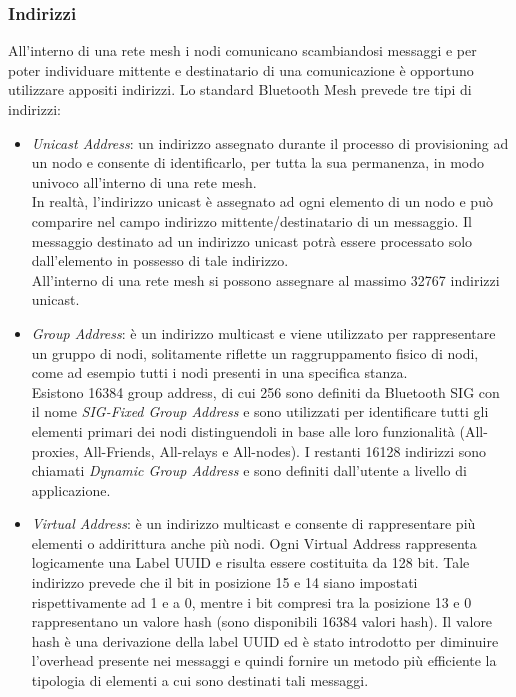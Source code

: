 \subsubsection{Indirizzi}
\label{subsub:indirizzi}
All'interno di una rete mesh i nodi comunicano scambiandosi messaggi e per poter individuare mittente e destinatario di una comunicazione è opportuno utilizzare appositi indirizzi. Lo standard Bluetooth Mesh prevede tre tipi di indirizzi:
\begin{itemize}
    \item \textit{Unicast Address}: un indirizzo assegnato durante il processo di provisioning ad un nodo e consente di identificarlo, per tutta la sua permanenza, in modo univoco all'interno di una rete mesh.\\
    In realtà, l'indirizzo unicast è assegnato ad ogni elemento di un nodo e può comparire nel campo indirizzo mittente/destinatario di un messaggio. Il messaggio destinato ad un indirizzo unicast potrà essere processato solo dall'elemento in possesso di tale indirizzo.\\
    All'interno di una rete mesh si possono assegnare al massimo 32767 indirizzi unicast.
    
    \item \textit{Group Address}: è un indirizzo multicast e viene utilizzato per rappresentare un gruppo di nodi, solitamente riflette un raggruppamento fisico di nodi, come ad esempio tutti i nodi presenti in una specifica stanza. \\
    Esistono 16384 group address, di cui 256 sono definiti da Bluetooth SIG con il nome \textit{SIG-Fixed Group Address} e sono utilizzati per identificare tutti gli elementi primari dei nodi distinguendoli in base alle loro funzionalità (All-proxies, All-Friends, All-relays e All-nodes). I restanti 16128 indirizzi sono chiamati \textit{Dynamic Group Address} e sono definiti dall'utente a livello di applicazione.
        
    \item \textit{Virtual Address}: è un indirizzo multicast e consente di rappresentare più elementi o addirittura anche più nodi. Ogni Virtual Address rappresenta logicamente una Label UUID e risulta essere costituita da 128 bit. Tale indirizzo prevede che il bit in posizione 15 e 14 siano impostati rispettivamente ad 1 e a 0, mentre i bit compresi tra la posizione 13 e 0 rappresentano un valore hash (sono disponibili 16384 valori hash). Il valore hash è una derivazione della label UUID ed è stato introdotto per diminuire l'overhead presente nei messaggi e quindi fornire un metodo più efficiente la tipologia di elementi a cui sono destinati tali messaggi. 
\end{itemize}

